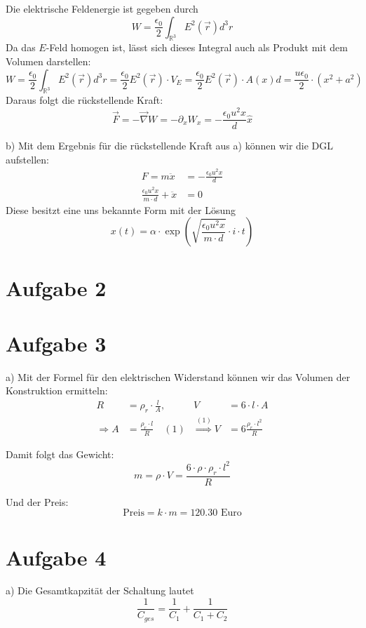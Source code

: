 \documentclass[11pt a4paper]{article}
\newcommand{\epsz}{\epsilon_0}
\begin{document}
Die elektrische Feldenergie ist gegeben durch
\[
	W = \frac{\epsz}{2} \int_{\mathbb{R}^3} E^2(\vec r) d^3r 
\]
Da das $E$-Feld homogen ist, lässt sich dieses Integral auch als Produkt 
mit dem Volumen darstellen:
\[
	W = \frac{\epsz}{2} \int_{\mathbb{R}^3} E^2(\vec r) d^3r 
	= 
	\frac{\epsz}{2} E^2(\vec r) \cdot V_{E}
	= 
	\frac{\epsz}{2} E^2(\vec r) \cdot A(x)d
	=
	\frac{u \epsz}{2} \cdot (x^2 + a^2)
\]
Daraus folgt die rückstellende Kraft:
\[
	\vec F = -\vec\nabla W = -\partial_x W_x 
	= -\frac{\epsz u^2 x}{d} \hat x
\]

\newpage
\setlength{\headheight}{0cm}

b) Mit dem Ergebnis für die rückstellende Kraft aus a) können wir die DGL 
aufstellen:
\begin{align*}
	F = m\ddot x&=-\frac{\epsz u^2 x}{d}  \\
	\frac{\epsz u^2 x}{m \cdot d} + \ddot x &= 0
\end{align*}
Diese besitzt eine uns bekannte Form mit der Lösung
\[
	x(t) = \alpha \cdot \exp\left(
	\sqrt{\frac{\epsz u^2 x}{m \cdot d}} \cdot i \cdot t
	\right)
\]

\section*{Aufgabe 2}
\section*{Aufgabe 3}

a)
Mit der Formel für den elektrischen Widerstand können wir das Volumen der 
Konstruktion ermitteln:
\begin{align*}
	R &= \rho_r \cdot \frac{l}{A}, & V &= 6 \cdot l \cdot A \\
	\Rightarrow A &= \frac{\rho_r \cdot l}{R} \quad (1)
	& \overset{(1)}{\Rightarrow} V &= 6 \frac{\rho_r \cdot l^2}{R}
\end{align*}

Damit folgt das Gewicht:
\[
	m = \rho \cdot V = \frac{6 \cdot \rho \cdot \rho_r \cdot l^2}{R}
\]

Und der Preis:
\[
	\text{Preis} = k \cdot m = 120.30 \text{ Euro}
\]

\section*{Aufgabe 4}
a)
Die Gesamtkapzität der Schaltung lautet
\[
	\frac{1}{C_{ges}} = \frac{1}{C_1} + \frac{1}{C_1 + C_2}
\]
\end{document}
